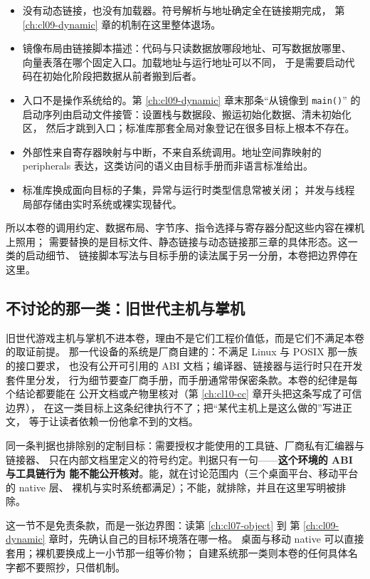 \documentclass[12pt,a4paper,fontset=fandol]{ctexbook}
\newcommand{\Fn}[1]{\texttt{#1()}}
\newcommand{\Nix}{\textsf{Linux}}
\begin{document}
\begin{itemize}
  \item 没有动态链接，也没有加载器。符号解析与地址确定全在链接期完成，
        第 \ref{ch:cl09-dynamic} 章的机制在这里整体退场。
  \item 镜像布局由链接脚本描述：代码与只读数据放哪段地址、可写数据放哪里、
        向量表落在哪个固定入口。加载地址与运行地址可以不同，
        于是需要启动代码在初始化阶段把数据从前者搬到后者。
  \item 入口不是操作系统给的。第 \ref{ch:cl09-dynamic} 章末那条“从镜像到 \Fn{main}”
        的启动序列由启动文件接管：设置栈与数据段、搬运初始化数据、清未初始化区，
        然后才跳到入口；标准库那套全局对象登记在很多目标上根本不存在。
  \item 外部性来自寄存器映射与中断，不来自系统调用。地址空间靠映射的 peripherals
        表达，这类访问的语义由目标手册而非语言标准给出。
  \item 标准库换成面向目标的子集，异常与运行时类型信息常被关闭；
        并发与线程局部存储由实时系统或裸实现替代。
\end{itemize}

所以本卷的调用约定、数据布局、字节序、指令选择与寄存器分配这些内容在裸机上照用；
需要替换的是目标文件、静态链接与动态链接那三章的具体形态。这一类的启动细节、
链接脚本写法与目标手册的读法属于另一分册，本卷把边界停在这里。

\subsection{不讨论的那一类：旧世代主机与掌机}\label{sec:cl01-excluded}

旧世代游戏主机与掌机不进本卷，理由不是它们工程价值低，而是它们不满足本卷的取证前提。
那一代设备的系统是厂商自建的：不满足 \Nix{} 与 POSIX 那一族的接口要求，
也没有公开可引用的 ABI 文档；编译器、链接器与运行时只在开发套件里分发，
行为细节要查厂商手册，而手册通常带保密条款。本卷的纪律是每个结论都要能在
公开文档或产物里核对（第 \ref{ch:cl10-cc} 章开头把这条写成了可信边界），
在这一类目标上这条纪律执行不了；把“某代主机上是这么做的”写进正文，
等于让读者依赖一份他拿不到的文档。

同一条判据也排除别的定制目标：需要授权才能使用的工具链、厂商私有汇编器与链接器、
只在内部文档里定义的符号约定。判据只有一句——\textbf{这个环境的 ABI 与工具链行为
能不能公开核对}。能，就在讨论范围内（三个桌面平台、移动平台的 native 层、
裸机与实时系统都满足）；不能，就排除，并且在这里写明被排除。

\begin{note}[title={覆盖范围的用法}]
这一节不是免责条款，而是一张边界图：读第 \ref{ch:cl07-object} 到
第 \ref{ch:cl09-dynamic} 章时，先确认自己的目标环境落在哪一格。
桌面与移动 native 可以直接套用；裸机要换成上一小节那一组等价物；
自建系统那一类则本卷的任何具体名字都不要照抄，只借机制。
\end{note}
\end{document}
